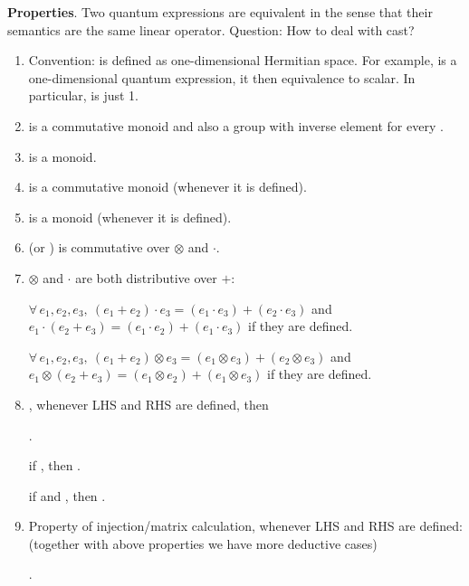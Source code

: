     \noindent\textbf{Properties}. Two quantum expressions are equivalent in the sense that their semantics are the same linear operator. Question: How to deal with cast? 
    \begin{enumerate}
        \item Convention:  is defined as one-dimensional Hermitian space. For example,  is a one-dimensional quantum expression, it then equivalence to scalar. In particular,  is just 1.
        \item {} is a commutative monoid and also a group with inverse element  for every .
        \item {} is a monoid.
        \item {} is a commutative monoid (whenever it is defined).
        \item {} is a monoid (whenever it is defined).
        \item \scalar (or ) is commutative over $\otimes$ and $\cdot$.
        \item $\otimes$ and $\cdot$ are both distributive over $+$: 
        
        $\forall\,e_1,e_2,e_3,\ (e_1+e_2)\cdot e_3 = (e_1\cdot e_3)+(e_2\cdot e_3)$ and $e_1\cdot(e_2+ e_3) = (e_1\cdot e_2)+(e_1\cdot e_3)$ if they are defined.
        
        $\forall\,e_1,e_2,e_3,\ (e_1+e_2)\otimes e_3 = (e_1\otimes e_3)+(e_2\otimes e_3)$ and $e_1\otimes(e_2+ e_3) = (e_1\otimes e_2)+(e_1\otimes e_3)$ if they are defined.
        \item {}, whenever LHS and RHS are defined, then
        
        . 
        
        if , then . 
        
        if  and , then . 
        \item Property of injection/matrix calculation, whenever LHS and RHS are defined: (together with above properties we have more deductive cases)
        
        .
        

\end{enumerate}
